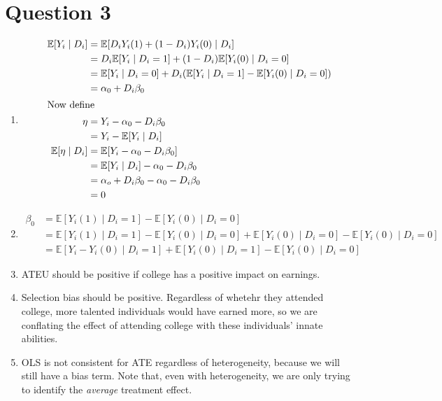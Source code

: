 \documentclass[11pt]{article}
\newcommand{\E}{\mathbb{E}}
\begin{document}
\section{Question 3}
\label{sec:org0342841}
  \begin{enumerate}[label=\alph*)]
\item 
\begin{align*}
\E[Y_i \mid D_i] &= \E[D_i Y_i(1) + (1 - D_i)Y_i(0) \mid D_i]\\
&= D_i \E [Y_i \mid D_i = 1] + (1 - D_i) \E [Y_i(0) \mid D_i = 0]\\
&= \E[Y_i \mid D_i = 0] + D_i (\E [Y_i \mid D_i = 1] - \E[Y_i (0) \mid D_i = 0])\\
&= \alpha_0 + D_i \beta_0     \\
\intertext{Now define}
\eta &= Y_i - \alpha_0 - D_i \beta_0 \\
&= Y_i - \E[Y_i \mid D_i]\\
\E[\eta \mid D_i] &= \E[Y_i - \alpha_0 - D_i \beta_0]\\
&= \E [Y_i \mid D_i] - \alpha_0 - D_i \beta_0\\
&= \alpha_o + D_i \beta_0 - \alpha_0 - D_i \beta_0\\
&= 0
\end{align*}
\item
\begin{align*}
\beta_0 &= \E [Y_i(1) \mid D_i = 1] - \E [Y_i(0) \mid D_i = 0]\\
&= \E[Y_i(1) \mid D_i = 1] - \E[Y_i(0) \mid D_i = 0] + \E[Y_i(0)\mid D_i = 0] - \E[Y_i(0)\mid D_i = 0]\\
&= \E[Y_i - Y_i(0) \mid D_i = 1] + \E[Y_i(0) \mid D_i = 1] - \E[Y_i (0) \mid D_i = 0]
\end{align*}
\item ATEU should be positive if college has a positive impact on earnings.

\item Selection bias should be positive. Regardless of whetehr they attended college, more talented individuals would have earned more, so we are conflating the effect of attending college with these individuals' innate abilities.

\item OLS is not consistent for ATE regardless of heterogeneity, because we will still have a bias term. Note that, even with heterogeneity, we are only trying to identify the \emph{average} treatment effect.
  \end{enumerate}
\end{document}
